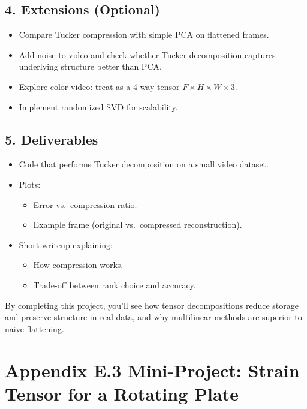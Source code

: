 \documentclass[
  letterpaper,
  DIV=11,
  numbers=noendperiod]{scrreprt}
\providecommand{\tightlist}{%
  \setlength{\itemsep}{0pt}\setlength{\parskip}{0pt}}
\begin{document}
\subsection{4. Extensions (Optional)}\label{extensions-optional-1}

\begin{itemize}
\tightlist
\item
  Compare Tucker compression with simple PCA on flattened frames.
\item
  Add noise to video and check whether Tucker decomposition captures
  underlying structure better than PCA.
\item
  Explore color video: treat as a 4-way tensor
  \(F \times H \times W \times 3\).
\item
  Implement randomized SVD for scalability.
\end{itemize}

\subsection{5. Deliverables}\label{deliverables-1}

\begin{itemize}
\item
  Code that performs Tucker decomposition on a small video dataset.
\item
  Plots:

  \begin{itemize}
  \tightlist
  \item
    Error vs.~compression ratio.
  \item
    Example frame (original vs.~compressed reconstruction).
  \end{itemize}
\item
  Short writeup explaining:

  \begin{itemize}
  \tightlist
  \item
    How compression works.
  \item
    Trade-off between rank choice and accuracy.
  \end{itemize}
\end{itemize}

By completing this project, you'll see how tensor decompositions reduce
storage and preserve structure in real data, and why multilinear methods
are superior to naive flattening.

\section{Appendix E.3 Mini-Project: Strain Tensor for a Rotating
Plate}\label{appendix-e.3-mini-project-strain-tensor-for-a-rotating-plate}
\end{document}
